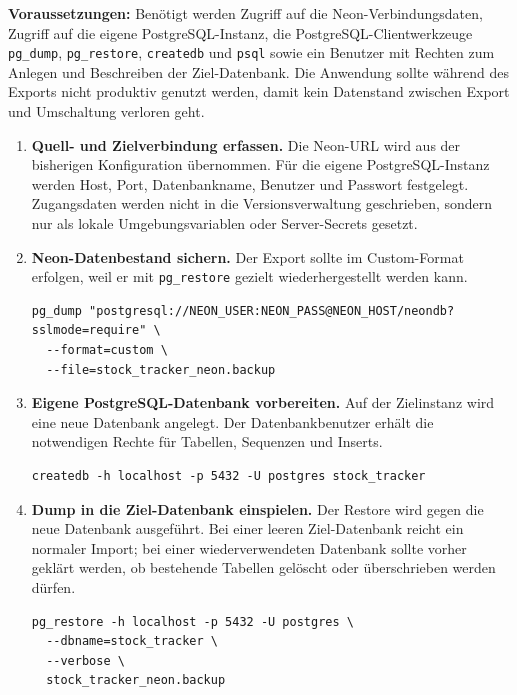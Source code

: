 \documentclass[12pt,a4paper]{article}
\begin{document}
\textbf{Voraussetzungen:} Benötigt werden Zugriff auf die Neon-Verbindungsdaten, Zugriff auf die eigene PostgreSQL-Instanz, die PostgreSQL-Clientwerkzeuge \texttt{pg\_dump}, \texttt{pg\_restore}, \texttt{createdb} und \texttt{psql} sowie ein Benutzer mit Rechten zum Anlegen und Beschreiben der Ziel-Datenbank. Die Anwendung sollte während des Exports nicht produktiv genutzt werden, damit kein Datenstand zwischen Export und Umschaltung verloren geht.

\begin{enumerate}[leftmargin=*]
    \item \textbf{Quell- und Zielverbindung erfassen.} Die Neon-URL wird aus der bisherigen Konfiguration übernommen. Für die eigene PostgreSQL-Instanz werden Host, Port, Datenbankname, Benutzer und Passwort festgelegt. Zugangsdaten werden nicht in die Versionsverwaltung geschrieben, sondern nur als lokale Umgebungsvariablen oder Server-Secrets gesetzt.

    \item \textbf{Neon-Datenbestand sichern.} Der Export sollte im Custom-Format erfolgen, weil er mit \texttt{pg\_restore} gezielt wiederhergestellt werden kann.
\begin{lstlisting}
pg_dump "postgresql://NEON_USER:NEON_PASS@NEON_HOST/neondb?sslmode=require" \
  --format=custom \
  --file=stock_tracker_neon.backup
\end{lstlisting}

    \item \textbf{Eigene PostgreSQL-Datenbank vorbereiten.} Auf der Zielinstanz wird eine neue Datenbank angelegt. Der Datenbankbenutzer erhält die notwendigen Rechte für Tabellen, Sequenzen und Inserts.
\begin{lstlisting}
createdb -h localhost -p 5432 -U postgres stock_tracker
\end{lstlisting}

    \item \textbf{Dump in die Ziel-Datenbank einspielen.} Der Restore wird gegen die neue Datenbank ausgeführt. Bei einer leeren Ziel-Datenbank reicht ein normaler Import; bei einer wiederverwendeten Datenbank sollte vorher geklärt werden, ob bestehende Tabellen gelöscht oder überschrieben werden dürfen.
\begin{lstlisting}
pg_restore -h localhost -p 5432 -U postgres \
  --dbname=stock_tracker \
  --verbose \
  stock_tracker_neon.backup
\end{lstlisting}


\end{enumerate}
\end{document}
